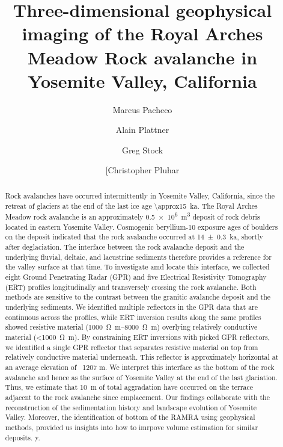 \documentclass[5p]{elsarticle}
\begin{document}
	\begin{frontmatter}

\title{Three-dimensional geophysical imaging of the Royal Arches Meadow Rock avalanche in Yosemite Valley, California}

\author[Marcus]{Marcus Pacheco}
\address[Marcus]{Earth & Environmental Sciences, California State University, Fresno}

\author[Alain]{Alain Plattner}
\address[Alain]{2Geological Sciences, University of Alabama}

\author[Greg]{Greg Stock}
\address[Greg]{National Park Service, Yosemite National Park}

\author[Chris]{[Christopher Pluhar}
\address[Chris]{Earth & Environmental Sciences, California State University, Fresno}



										\begin{abstract}
										

Rock avalanches have occurred intermittently in Yosemite Valley, California, since the retreat of glaciers at the end of the last ice age \SI{\approx15}{\kilo a}. The Royal Arches Meadow rock avalanche is an approximately \SI{0.5e6}{m^3} deposit of rock debris located in eastern Yosemite Valley. Cosmogenic beryllium-10 exposure ages of boulders on the deposit indicated that the rock avalanche occurred at \SI{14+-0.3}{\kilo a}, shortly after deglaciation. The interface between the rock avalanche deposit and the underlying fluvial, deltaic, and lacustrine sediments therefore provides a reference for the valley surface at that time. To investigate amd locate this interface, we collected eight Ground Penetrating Radar (GPR) and five Electrical Resistivity Tomography (ERT) profiles longitudinally and transversely crossing the rock avalanche. Both methods are sensitive to the contrast between the granitic avalanche deposit and the underlying sediments. We identified multiple reflectors in the GPR data that are continuous across the profiles, while ERT inversion results along the same profiles showed resistive material (\SIrange{1000}{8000}{\ohm.m}) overlying relatively conductive material (\SI{<1000}{\ohm.m}). By constraining ERT inversions with picked GPR reflectors, we identified a single GPR reflector that separates resistive material on top from relatively conductive material underneath. This reflector is approximately horizontal at an average elevation of ~1207 m. We interpret this interface as the bottom of the rock avalanche and hence as the surface of Yosemite Valley at the end of the last glaciation. Thus, we estimate that \SI{10}{m} of total aggradation have occurred on the terrace adjacent to the rock avalanche since emplacement. Our findings collaborate with the reconstruction of the sedimentation history and landscape evolution of Yosemite Valley. Moreover, the identification of bottom of the RAMRA using geophysical methods, provided us insights into how to imrpove volume estimation for similar deposits.     
y.


\end{abstract}
\end{frontmatter}
\end{document}
